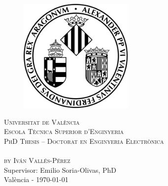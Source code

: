 
\makeatletter
\begin{titlepage}

	\begin{figure}[t]
		\centering\includegraphics[width=0.5\textwidth]{titlepage/images/logo}
	\end{figure}
	
	\begin{center}
	\textsc{ \LARGE{Universitat de València \\}}
	\textsc{ \LARGE{Escola Tècnica Superior d'Enginyeria \\ }}
	\vspace{5mm}
	{\textsc{\large PhD Thesis -- Doctorat en Enginyeria Electrònica}\\}
	\vspace{40mm}
	\LARGE{\textbf{\@title}\\}
	\vspace{5mm}
	{\textsc{\large by Iván Vallés-Pérez}\\}
	\vspace{40mm}
	\large{Supervisor: Emilio Soria-Olivas, PhD \\ }
	\large{València - \monthyeardate\today }
	\end{center}

\end{titlepage}
\makeatother